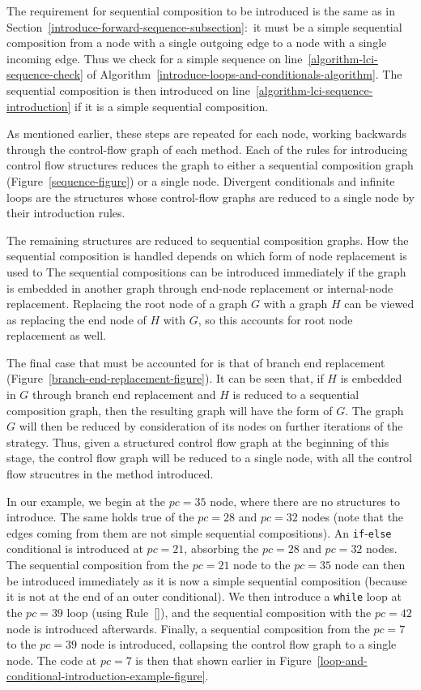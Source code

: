 The requirement for sequential composition to be introduced is the
same as in Section~\ref{introduce-forward-sequence-subsection}:~it
must be a simple sequential composition from a node with a single
outgoing edge to a node with a single incoming edge.
Thus we check for a simple sequence on
line~\ref{algorithm-lci-sequence-check} of
Algorithm~\ref{introduce-loops-and-conditionals-algorithm}.
The sequential composition is then introduced on
line~\ref{algorithm-lci-sequence-introduction} if it is a simple
sequential composition.

As mentioned earlier, these steps are repeated for each node, working
backwards through the control-flow graph of each method.
Each of the rules for introducing control flow structures reduces the
graph to either a sequential composition graph
(Figure~\ref{sequence-figure}) or a single node.
Divergent conditionals and infinite loops are the structures whose
control-flow graphs are reduced to a single node by their introduction
rules.

The remaining structures are reduced to sequential composition graphs.
How the sequential composition is handled depends on which form of node replacement is used to 
The sequential compositions can be introduced immediately if the graph
is embedded in another graph through end-node replacement or
internal-node replacement.
Replacing the root node of a graph $G$ with a graph $H$ can be viewed
as replacing the end node of $H$ with $G$, so this accounts for root
node replacement as well.

The final case that must be accounted for is that of branch end
replacement (Figure~\ref{branch-end-replacement-figure}).
It can be seen that, if $H$ is embedded in $G$ through branch end
replacement and $H$ is reduced to a sequential composition graph, then
the resulting graph will have the form of $G$.
The graph $G$ will then be reduced by consideration of its nodes on
further iterations of the strategy.
Thus, given a structured control flow graph at the beginning of this
stage, the control flow graph will be reduced to a single node, with
all the control flow strucutres in the method introduced.

In our example, we begin at the $pc=35$ node, where there are no
structures to introduce. 
The same holds true of the $pc=28$ and $pc=32$ nodes (note that the
edges coming from them are not simple sequential compositions).
An \texttt{if}-\texttt{else} conditional is introduced at $pc=21$,
absorbing the $pc=28$ and $pc=32$ nodes.
The sequential composition from the $pc=21$ node to the $pc=35$ node
can then be introduced immediately as it is now a simple sequential
composition (because it is not at the end of an outer conditional).
We then introduce a \texttt{while} loop at the $pc=39$ loop (using
Rule~[]), and the sequential
composition with the $pc=42$ node is introduced afterwards.
Finally, a sequential composition from the $pc=7$ to the $pc=39$ node
is introduced, collapsing the control flow graph to a single node.
The code at $pc=7$ is then that shown earlier in
Figure~\ref{loop-and-conditional-introduction-example-figure}.